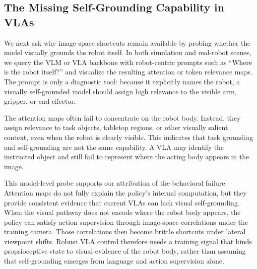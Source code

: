 \subsection{The Missing Self-Grounding Capability in VLAs}

We next ask why image-space shortcuts remain available by probing whether the
model visually grounds the robot itself. In both simulation and real-robot
scenes, we query the VLM or VLA backbone with robot-centric prompts such as
``Where is the robot itself?'' and visualize the resulting attention or token
relevance maps. The prompt is only a diagnostic tool: because it explicitly
names the robot, a visually self-grounded model should assign high relevance
to the visible arm, gripper, or end-effector.

The attention maps often fail to concentrate on the robot body. Instead, they
assign relevance to task objects, tabletop regions, or other visually salient
context, even when the robot is clearly visible. This indicates that task
grounding and self-grounding are not the same capability. A VLA may identify
the instructed object and still fail to represent where the acting body appears
in the image.

This model-level probe supports our attribution of the behavioral failure.
Attention maps do not fully explain the policy's internal computation, but
they provide consistent evidence that current VLAs can lack visual
self-grounding. When the visual pathway does not encode where the robot body
appears, the policy can satisfy action supervision through image-space
correlations under the training camera. Those correlations then become brittle
shortcuts under lateral viewpoint shifts. Robust VLA control therefore needs a
training signal that binds proprioceptive state to visual evidence of the
robot body, rather than assuming that self-grounding emerges from language and
action supervision alone.
